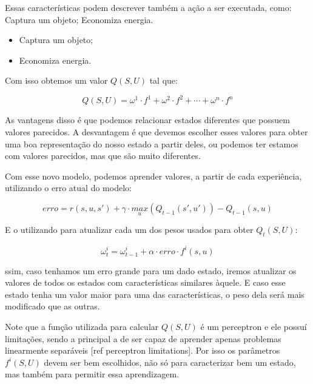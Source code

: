 Essas características podem descrever também a ação a ser executada, como:
Captura um objeto;
Economiza energia.

\begin{itemize}
	\item Captura um objeto;
	\item Economiza energia.
\end{itemize}

Com isso obtemos um valor $ Q \left( S, U \right) $ tal que:

\begin{equation}
	Q \left( S, U \right) = \omega^1 \cdot f^1 + \omega^2 \cdot f^2 + \cdots + \omega^n \cdot f^n
\end{equation}

As vantagens disso é que podemos relacionar estados diferentes que possuem valores parecidos. A desvantagem é que devemos escolher esses valores para obter uma boa representação do nosso estado a partir deles, ou podemos ter estamos com valores parecidos, mas que são muito diferentes.

Com esse novo modelo, podemos aprender valores, a partir de cada experiência, utilizando o erro atual do modelo:

\begin{equation}
	erro = r \left( s, u, s' \right) + \gamma \cdot \underset{u}{max} \left( Q_{t-1} \left( s', u' \right) \right) - Q_{t-1} \left( s, u \right)
\end{equation}

E o utilizando para atualizar cada um dos pesos usados para obter $ Q_t \left( S, U \right) $:

\begin{equation}
	\omega_t^i = \omega_{t-1}^i + \alpha \cdot erro \cdot f^i \left( s, u \right)
\end{equation}

ssim, caso tenhamos um erro grande para um dado estado, iremos atualizar os valores de todos os estados com características similares àquele. E caso esse estado tenha um valor maior para uma das características, o peso dela será mais modificado que as outras.

Note que a função utilizada para calcular $ Q \left( S, U \right) $ é um perceptron e ele possuí limitações, sendo a principal a de ser capaz de aprender apenas problemas linearmente separáveis [ref perceptron limitations]. Por isso os parâmetros $ f^i \left( S, U \right) $ devem ser bem escolhidos, não só para caracterizar bem um estado, mas também para permitir essa aprendizagem.


